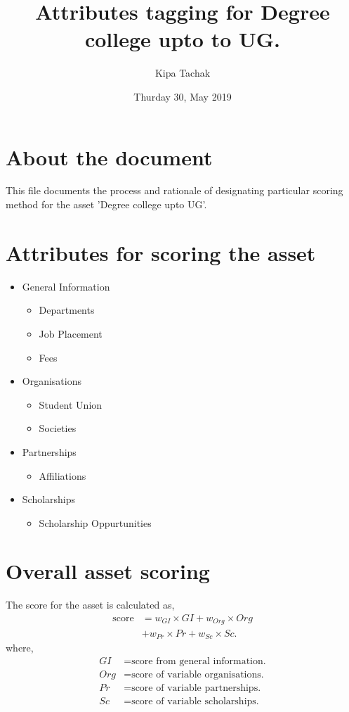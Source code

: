 \documentclass[oneside,twocolumn]{article}
\title{Attributes tagging for Degree college upto to UG.}
\date{Thurday 30, May 2019}
\author{Kipa Tachak}
\begin{document}
\maketitle

\section{About the document}
This file documents the process and rationale of designating
particular scoring method for the asset 'Degree college upto
UG'.

\section{Attributes for scoring the asset}
\begin{itemize}
\item General Information
  \begin{itemize}
  \item Departments
  \item Job Placement
  \item Fees
  \end{itemize}
\item Organisations
  \begin{itemize}
  \item Student Union
  \item Societies
  \end{itemize}
\item Partnerships
  \begin{itemize}
  \item Affiliations
  \end{itemize}
\item Scholarships
  \begin{itemize}
  \item Scholarship Oppurtunities
  \end{itemize}
\end{itemize}

\section{Overall asset scoring}
The score for the asset is calculated as,
\begin{align*}
	\text{score} &= w_{GI} \times GI + w_{Org} \times Org \\
		     &+ w_{Pr} \times Pr + w_{Sc} \times Sc.
\end{align*}
where,
\begin{align*}
	GI &= \text{score from general information.} \\
	Org &= \text{score of variable organisations.} \\
	Pr &= \text{score of variable partnerships.} \\
	Sc &= \text{score of variable scholarships.}
\end{align*}
\end{document}
